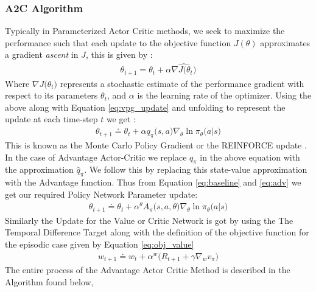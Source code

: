 \documentclass[14pt]{extarticle}
\numberwithin{equation}{section}
\begin{document}
	\subsubsection{A2C Algorithm}
	Typically in Parameterized Actor Critic methods, we seek to maximize the performance such that each update to the objective function $J(\theta)$ approximates a gradient \textit{ascent} in $J$, this is given by :
	\begin{align}
	\theta_{t+1} =  	\theta_t + \alpha \widehat{\nabla J\big(\theta_t\big)}
	\end{align} 
	Where $\nabla J\big(\theta_t\big)$ represents a stochastic estimate of the performance gradient with respect to its parameters $\theta_t$, and $\alpha$ is the learning rate of the optimizer.
	Using the above along with Equation \ref{eq:vpg_update} and unfolding to represent the update at each time-step $t$ we get :
	\begin{align}
	\theta_{t+1} \doteq \theta_t +  \alpha q_{\pi}\big(s,a\big) \nabla_{\theta}\ln\pi_{\theta}\big(a|s\big)
	\end{align}
	This is known as the Monte Carlo Policy Gradient or the REINFORCE update \cite{Williams92REINFORCE}. In the case of Advantage Actor-Critic we replace $q_{\pi}$ in the above equation with the approximation $\hat{q}_{\pi}$. We follow this by replacing this state-value approximation with the Advantage function. Thus from Equation \ref{eq:baseline} and \ref{eq:adv} we get our required Policy Network Parameter update:
	\begin{align}
	\theta_{t+1} \doteq \theta_t +  \alpha^{\theta} A_{\pi}\big(s,a,\theta\big) \nabla_{\theta}\ln\pi_{\theta}\big(a|s\big)
	\end{align}
	Similarly the Update for the Value or Critic Network is got by using the The Temporal Difference Target along with the definition of the objective function for the episodic case given by Equation \ref{eq:obj_value}\cite{Sutton-introRL}
	\begin{align}
w_{t+1} \doteq w_t +  \alpha^{w}\big(R_{t+1} + \gamma\nabla_{w}v_{\pi}\big)  
\end{align}
	The entire process of the Advantage Actor Critic Method is described in the Algorithm found below,
\end{document}
